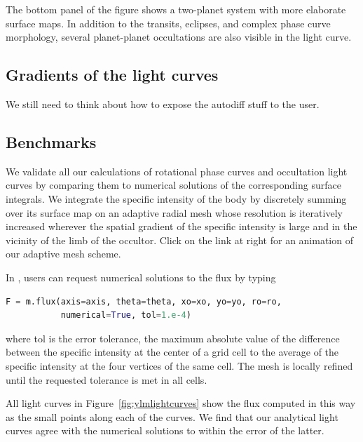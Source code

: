 \documentclass[modern]{aastex61}
\begin{document}
The bottom panel of the figure shows a two-planet system with more elaborate
surface maps. In addition to the transits, eclipses, and complex phase curve
morphology, several planet-planet occultations are also visible in the
light curve.

\subsection{Gradients of the light curves}
\label{sec:gradients}
We still need to think about how to expose the autodiff stuff to the user.


\subsection{Benchmarks}
\label{sec:starrybenchmarks}

We validate all our calculations of rotational phase curves and occultation
light curves by comparing them to numerical solutions of the corresponding
surface integrals. We integrate the specific intensity of the body by
discretely summing over its surface map on an adaptive radial mesh whose
resolution is iteratively increased wherever the spatial gradient of the
specific intensity is large and in the vicinity of the limb of the occultor.
 Click on the link at right for an animation of our
adaptive mesh scheme.

In \starry, users can request numerical solutions to the flux by typing
%
\begin{lstlisting}[language=Python,firstnumber=last]
F = m.flux(axis=axis, theta=theta, xo=xo, yo=yo, ro=ro,
           numerical=True, tol=1.e-4)
\end{lstlisting}
%
where \textsf{tol} is the error tolerance, the maximum absolute value of the
difference between the
specific intensity at the center of a grid cell to the average of the specific
intensity at the four vertices of the same cell. The mesh is locally
refined until the requested tolerance is met in all cells.

All light curves in Figure~\ref{fig:ylmlightcurves} show the flux computed
in this way as the small points along each of the curves. We find that our
analytical light curves agree with the numerical solutions to within the error
of the latter.
\end{document}
